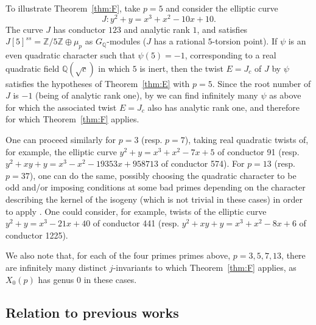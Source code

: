 \documentclass[10pt]{amsart}
\numberwithin{equation}{section}
\theoremstyle{definition}
\theoremstyle{remark}
\newcommand{\Z}{\mathbb{Z}}
\newcommand{\Q}{\mathbb{Q}}
\begin{document}
To illustrate Theorem~\ref{thm:F}, take $p=5$ and consider the elliptic curve
\begin{displaymath}
J: y^2+y=x^3+x^2-10x+10.
\end{displaymath} 
The curve $J$ has conductor $123$ and analytic rank $1$, and satisfies $J[5]^{ss}=\Z/5\Z\oplus\mu_p$ as $G_\Q$-modules ($J$ has a rational $5$-torsion point). If $\psi$ is an even quadratic character such that $\psi(5)=-1$, corresponding to a real quadratic field $\Q(\sqrt{c})$ in which $5$ is inert, then the twist $E=J_c$ of $J$ by $\psi$ satisfies the hypotheses of Theorem~\ref{thm:E} with $p=5$. Since the root number of $J$ is $-1$ (being of analytic rank one), by \cite[Thm.~B.2]{twist} we can find infinitely many $\psi$ as above for which the associated twist $E=J_c$ also has analytic rank one, and therefore for which Theorem~\ref{thm:F} applies. 

One can proceed similarly for $p=3$ (resp. $p=7$), taking real quadratic twists of, for example, the elliptic curve $y^2+y=x^3+x^2-7x+5$ of conductor 91 (resp. $y^2+xy+y=x^{3}-x^{2}-19353x+958713$ of conductor 574). For $p=13$ (resp. $p=37$), one can do the same, possibly choosing the quadratic character to be odd and/or imposing conditions at some bad primes depending on the character describing the kernel of the isogeny (which is not trivial in these cases) in order to apply \cite[Thm.~B.2]{twist}. One could consider, for example, twists of the elliptic curve $y^2+y=x^3-21x+40$ of conductor 441 (resp. $y^2+xy+y=x^3+x^2-8x+6$ of conductor 1225). 

We also note that, for each of the four primes primes above, $p=3,5,7,13$, there are infinitely many distinct $j$-invariants to which Theorem~\ref{thm:F} applies, as $X_0(p)$ has genus $0$ in these cases. 


\subsection{Relation to previous works}
\end{document}
